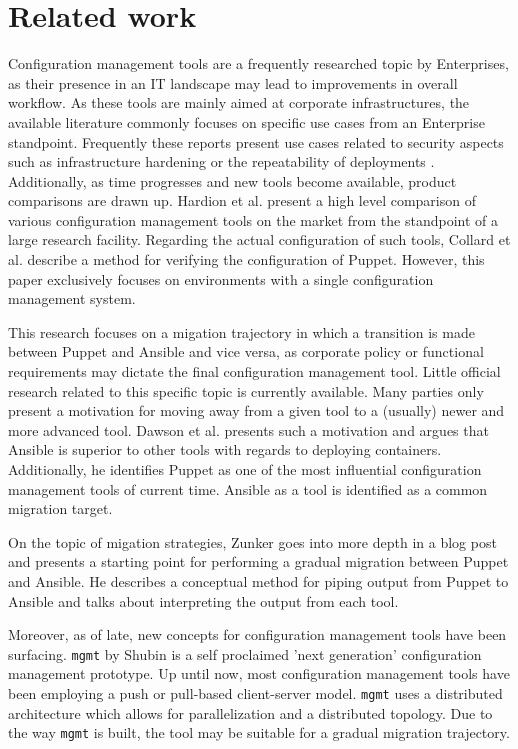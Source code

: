 \section{Related work}\label{sec:relatedwork}
Configuration management tools are a frequently researched topic by Enterprises, as their presence in an IT landscape  may lead to improvements in overall workflow. As these tools are mainly aimed at corporate infrastructures, the available literature commonly focuses on specific use cases from an Enterprise standpoint. Frequently these reports present use cases related to security aspects such as infrastructure hardening \cite{dotson2014security} or the repeatability of deployments \cite{ruiz2015reconstructable}. Additionally, as time progresses and new tools become available, product comparisons are drawn up. Hardion et al. \cite{Hardion2013} present a high level comparison of various configuration management tools on the market from the standpoint of a large research facility. Regarding the actual configuration of such tools, Collard et al. \cite{Collard2015} describe a method for verifying the configuration of Puppet. However, this paper exclusively focuses on environments with a single configuration management system. 

This research focuses on a migation trajectory in which a transition is made between Puppet and Ansible and vice versa, as corporate policy or functional requirements may dictate the final configuration management tool. Little official research related to this specific topic is currently available. Many parties only present a motivation for moving away from a given tool to a (usually) newer and more advanced tool. Dawson et al. \cite{dawson_hall_hecht_2014} presents such a motivation and argues that Ansible is superior to other tools with regards to deploying containers. Additionally, he identifies Puppet as one of the most influential configuration management tools of current time. Ansible as a tool is identified as a common migration target. 

On the topic of migation strategies, Zunker \cite{zunker_2014} goes into more depth in a blog post and presents a starting point for performing a gradual migration between Puppet and Ansible. He describes a conceptual method for piping output from Puppet to Ansible and talks about interpreting the output from each tool.

Moreover, as of late, new concepts for configuration management tools have been surfacing. \texttt{mgmt} by Shubin \cite{shubin2016} is a self proclaimed 'next generation' configuration management prototype.  Up until now, most configuration management tools have been employing a push or pull-based client-server model. \texttt{mgmt} uses a distributed architecture which allows for parallelization and a distributed topology. Due to the way \texttt{mgmt} is built, the tool may be suitable for a gradual migration trajectory.
